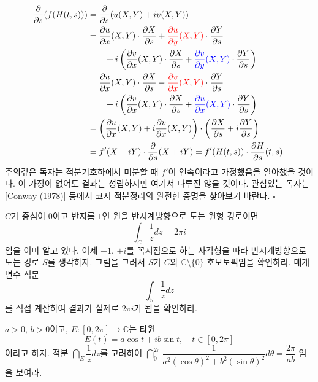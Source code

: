 \begin{align*}
\dfrac\partial{\partial s}(f(H(t,s)))
&= \dfrac\partial{\partial s}(u(X,Y) + iv(X,Y)) \\
&= \dfrac{\partial u}{\partial x}(X,Y)\cdot \dfrac{\partial X}{\partial s}
+ \textcolor{red}{\dfrac{\partial u}{\partial y}(X,Y)}\cdot \dfrac{\partial Y}{\partial s} \\
&\quad\quad + i \left(
\dfrac{\partial v}{\partial x}(X,Y)\cdot \dfrac{\partial X}{\partial s}
+ \textcolor{blue}{\dfrac{\partial v}{\partial y}(X,Y)}\cdot \dfrac{\partial Y}{\partial s}
\right) \\
&= \dfrac{\partial u}{\partial x}(X,Y)\cdot \dfrac{\partial X}{\partial s}
- \textcolor{red}{\dfrac{\partial v}{\partial x}(X,Y)}\cdot \dfrac{\partial Y}{\partial s} \\
&\quad\quad + i \left(
\dfrac{\partial v}{\partial x}(X,Y)\cdot \dfrac{\partial X}{\partial s}
+ \textcolor{blue}{\dfrac{\partial u}{\partial x}(X,Y)}\cdot \dfrac{\partial Y}{\partial s}
\right) \\
&= \left( \dfrac{\partial u}{\partial x}(X,Y) + i \dfrac{\partial v}{\partial x}(X,Y) \right)
\cdot \left( \dfrac{\partial X}{\partial s} + i\dfrac{\partial Y}{\partial s} \right) \\
&= f'(X+iY)\cdot \dfrac \partial{\partial s} (X+iY)
= f'(H(t,s))\cdot \dfrac{\partial H}{\partial s}(t,s).
\end{align*}
주의깊은 독자는 적분기호하에서 미분할 때 $f'$이 연속이라고 가정했음을 알아챘을 것이다.
이 가정이 없어도 결과는 성립하지만 여기서 다루진 않을 것이다.
관심있는 독자는 [Conway (1978)] 등에서   %
코시 적분정리의 완전한 증명을 찾아보기 바란다.
\hfill $\square$

\begin{salt_exercise} \label{ex-3-18}
$C$가 중심이 $0$이고 반지름 $1$인 원을 반시계방향으로 도는 원형 경로이면
\[
\int_C \dfrac 1z dz = 2\pi i
\]
임을 이미 알고 있다.
이제 $\pm 1$, $\pm i$를 꼭지점으로 하는 사각형을 따라 반시계방향으로 도는 경로 $S$를 생각하자.
그림을 그려서 $S$가 $C$와 $\mathbb C\setminus \{0\}$-호모토픽임을 확인하라.
매개변수 적분
\[
\int_S \dfrac 1z dz
\]
를 직접 계산하여 결과가 실제로 $2\pi i$가 됨을 확인하라.
\end{salt_exercise}

\begin{salt_exercise} \label{ex-3-19}
$a>0$, $b>0$이고, $E:[0,2\pi] \to \mathbb C$는 타원
\[
E(t) = a\cos t + ib\sin t, \quad t\in [0,2\pi]
\]
이라고 하자.
적분 $\dint_E \dfrac 1z dz$를 고려하여
$\dint_0^{2\pi} \dfrac 1{a^2(\cos \theta)^2 + b^2(\sin \theta)^2}d\theta = \dfrac{2\pi}{ab}$
임을 보여라.
\end{salt_exercise}

